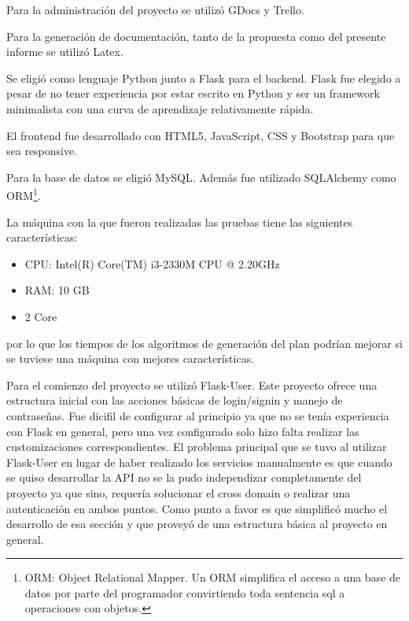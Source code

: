 \documentclass[a4paper]{article}
\begin{document}
Para la administración del proyecto se utilizó GDocs y Trello.\newline

Para la generación de documentación, tanto de la propuesta como del presente informe se utilizó Latex.\newline

Se eligió como lenguaje Python junto a Flask\cite{FLASK_OFICIAL} para el backend. Flask fue elegido a pesar de no tener experiencia por estar escrito en Python y ser un framework minimalista con una curva de aprendizaje relativamente rápida.\newline

El frontend fue desarrollado con HTML5, JavaScript, CSS y Bootstrap\cite{BOOTSTRAP} para que sea responsive.\newline

Para la base de datos se eligió MySQL\cite{MYSQL}. Además fue utilizado SQLAlchemy\cite{SQLALCHEMY_OFICIAL} como ORM\footnote{ORM: Object Relational Mapper. Un ORM simplifica el acceso a una base de datos por parte del programador convirtiendo toda sentencia sql a operaciones con objetos.}.\newline

La máquina con la que fueron realizadas las pruebas tiene las siguientes características:
\begin{itemize}
	\item CPU: Intel(R) Core(TM) i3-2330M CPU @ 2.20GHz
	\item RAM: 10 GB
	\item 2 Core
\end{itemize}
por lo que los tiempos de los algoritmos de generación del plan podrían mejorar si se tuviese una máquina con mejores características.\newline

Para el comienzo del proyecto se utilizó Flask-User\cite{FLASK_USER}. Este proyecto ofrece una estructura inicial con las acciones básicas de login/signin y manejo de contraseñas. Fue dicifil de configurar al principio ya que no se tenía experiencia con Flask en general, pero una vez configurado solo hizo falta realizar las customizaciones correspondientes. El problema principal que se tuvo al utilizar Flask-User en lugar de haber realizado los servicios manualmente es que cuando se quiso desarrollar la API no se la pudo independizar completamente del proyecto ya que sino, requería solucionar el cross domain o realizar una autenticación en ambos puntos. Como punto a favor es que simplificó mucho el desarrollo de esa sección y que proveyó de una estructura básica al proyecto en general.\newline
\end{document}
